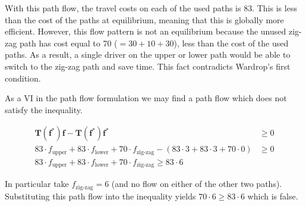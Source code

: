 With this path flow, the travel costs on each of the used paths is 83.
This is less than the cost of the paths at equilibrium, meaning that this is globally more efficient.
However, this flow pattern is not an equilibrium because the unused zig-zag path has cost equal to 70 ($=30+10+30$), less than the cost of the used paths.
As a result, a single driver on the upper or lower path would be able to switch to the zig-zag path and save time.
This fact contradicts Wardrop's first condition.

As a VI in the path flow formulation we may find a path flow which does not satisfy the inequality.

\begin{align*}
    \mathbf{T}(\mathbf{f}^*)\mathbf{f} - \mathbf{T}(\mathbf{f}^*)\mathbf{f}^* &\geq 0\\
    83\cdot f_{\text{upper}} + 83\cdot f_{\text{lower}} + 70 \cdot f_{\text{zig-zag}} - (83\cdot 3 + 83\cdot 3 + 70\cdot 0) &\geq 0\\
    83\cdot f_{\text{upper}} + 83\cdot f_{\text{lower}} + 70 \cdot f_{\text{zig-zag}} \geq 83\cdot 6 
\end{align*}

In particular take $f_{\text{zig-zag}}=6$ (and no flow on either of the other two paths). Substituting this path flow into the inequality yields $70\cdot 6 \geq 83 \cdot 6$ which is false.
